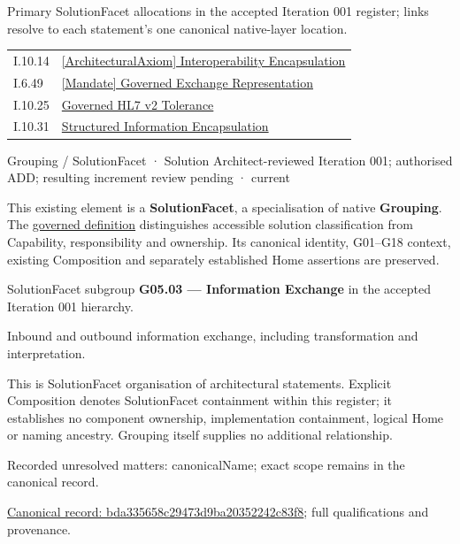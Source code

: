 Primary SolutionFacet allocations in the accepted Iteration 001 register; links resolve to each statement’s one canonical native-layer location.\par
\begin{longtable}{p{.22\linewidth}p{.73\linewidth}}
I.10.14 & \hyperref[element:e9e0b4f82b6544e7ba87651c578d82c2]{[ArchitecturalAxiom] Interoperability Encapsulation} \\
I.6.49 & \hyperref[element:e9d06b3fe6b744cc86bd2a136e02165a]{[Mandate] Governed Exchange Representation} \\
I.10.25 & \hyperref[element:0968fc163ae54514bc1f02471fe6d866]{Governed HL7 v2 Tolerance} \\
I.10.31 & \hyperref[element:6973441f2d62448188af9bfce5ad9d9f]{Structured Information Encapsulation} \\
\end{longtable}
\label{element:bda335658c29473d9ba20352242c83f8}
{\small Grouping / SolutionFacet · Solution Architect-reviewed Iteration 001; authorised ADD; resulting increment review pending · current}\par

This existing element is a \textbf{SolutionFacet}, a specialisation of native
\textbf{Grouping}. The \href{\detokenize{../../../../../../../governance/continuum-representation.md#solutionfacet-classification--1119-candidate}}{governed definition}
distinguishes accessible solution classification from Capability, responsibility
and ownership. Its canonical identity, G01–G18 context, existing Composition
and separately established Home assertions are preserved.



SolutionFacet subgroup \textbf{G05.03 — Information Exchange} in the accepted Iteration 001 hierarchy.



Inbound and outbound information exchange, including transformation and interpretation.



This is SolutionFacet organisation of architectural statements. Explicit Composition denotes SolutionFacet containment within this register; it establishes no component ownership, implementation containment, logical Home or naming ancestry. Grouping itself supplies no additional relationship.


{\small Recorded unresolved matters: canonicalName; exact scope remains in the canonical record.}\par
{\footnotesize \href{../../../../../../../continuum/grouping/bda335658c29473d9ba20352242c83f8.md}{Canonical record: bda335658c29473d9ba20352242c83f8}; full qualifications and provenance.}\par
